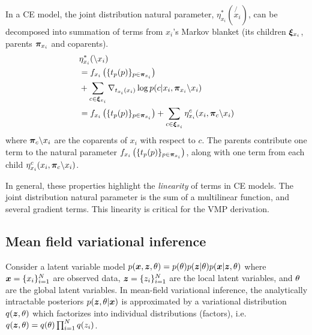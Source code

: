 
\begin{property}
\label{prop:jointparam}
In a CE model,
the joint distribution natural parameter, $\eta^*_{x_i}(\not{x_i})$,
can be decomposed into summation of terms from $x_i$'s Markov blanket
(its children $\bm{\xi}_{x_i}$, parents $\bm{\pi}_{x_i}$ and coparents).
\begin{equation}
\begin{split}
    &\eta^*_{x_i}(\backslash x_i) \\
    &= f_{x_i}\left(\{t_p(p)\}_{p \in \bm{\pi}_{x_i}}\right)\\
    &+ \sum_{c \in \bm{\xi}_{x_i}} \nabla_{t_{x_i}(x_i)}\log p(c | x_i, \bm{\pi}_{x_i} \backslash x_i)\\
    &= f_{x_i}\left(\{t_p(p)\}_{p \in \bm{\pi}_{x_i}}\right)
    + \sum_{c \in \bm{\xi}_{x_i}} \eta^c_{x_i}(x_i, \bm{\pi}_c \backslash x_i)
\end{split}
\end{equation}
where $\bm{\pi}_c \backslash x_i$ are the coparents of $x_i$ with respect to $c$.
The parents contribute one term to the natural parameter $f_{x_i}\left(\{t_p(p)\}_{p \in \bm{\pi}_{x_i}}\right)$, along with one
term from each child $\eta^c_{x_i}(x_i, \bm{\pi}_c \backslash x_i)$.

\end{property}
In general, these properties highlight the \emph{linearity} of terms
in CE models. The joint distribution natural parameter
is the sum of a multilinear function,
and several gradient terms.
This linearity is critical for the VMP derivation.


\subsection{Mean field variational inference}

Consider a latent variable model $p(\bm{x}, \bm{z}, \theta) = p(\theta)p(\bm{z} | \theta)p(\bm{x} | \bm{z}, \theta)$
where $\bm{x}=\{x_i\}_{i = 1}^N$ are observed data, $\bm{z} =\{z_i\}_{i = 1}^N$ are
the local latent variables, and $\theta$ are the global latent variables.
In mean-field variational inference, 
the analytically intractable
posteriors $p(\bm{z}, \theta|\bm{x})$ is approximated
by a variational distribution $q(\bm{z}, \theta)$
which factorizes into individual distributions (factors), i.e.
$q(\bm{z}, \theta) = q(\theta)\prod_{i = 1}^N q(z_i)$.

